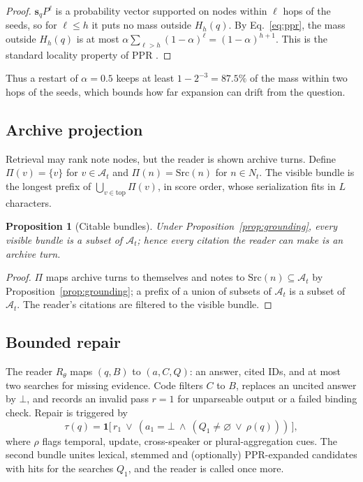 \documentclass[10pt]{article}
\theoremstyle{plain}
\newtheorem{proposition}{Proposition}
\theoremstyle{definition}
\theoremstyle{remark}
\newcommand{\A}{\mathcal{A}}
\begin{document}
\begin{proof}
$\mathbf{s}_qP^{\ell}$ is a probability vector supported on nodes within $\ell$
hops of the seeds, so for $\ell\le h$ it puts no mass outside $H_h(q)$. By
Eq.~\eqref{eq:ppr}, the mass outside $H_h(q)$ is at most
$\alpha\sum_{\ell>h}(1-\alpha)^{\ell}=(1-\alpha)^{h+1}$. This is the standard
locality property of PPR \citep{andersen2006local}.
\end{proof}

Thus a restart of $\alpha=0.5$ keeps at least $1-2^{-3}=87.5\%$ of the mass
within two hops of the seeds, which bounds how far expansion can drift from the
question.

\subsection{Archive projection}

Retrieval may rank note nodes, but the reader is shown archive turns. Define
$\Pi(v)=\{v\}$ for $v\in\A_t$ and $\Pi(n)=\mathrm{Src}(n)$ for $n\in N_t$. The
visible bundle is the longest prefix of $\bigcup_{v\in\mathrm{top}}\Pi(v)$, in
score order, whose serialization fits in $L$ characters.

\begin{proposition}[Citable bundles]
\label{prop:projection}
Under Proposition~\ref{prop:grounding}, every visible bundle is a subset of $\A_t$; hence
every citation the reader can make is an archive turn.
\end{proposition}

\begin{proof}
$\Pi$ maps archive turns to themselves and notes to $\mathrm{Src}(n)\subseteq\A_t$
by Proposition~\ref{prop:grounding}; a prefix of a union of subsets of $\A_t$ is a subset of
$\A_t$. The reader's citations are filtered to the visible bundle.
\end{proof}

\subsection{Bounded repair}

The reader $R_\theta$ maps $(q,B)$ to $(a,C,Q)$: an answer, cited IDs, and at most
two searches for missing evidence. Code filters $C$ to $B$, replaces an uncited
answer by $\bot$, and records an invalid pass $r=1$ for unparseable output or a
failed binding check. Repair is triggered by
\begin{equation}
\tau(q)=\mathbf{1}\bigl[\,r_1\ \lor\ (a_1=\bot\ \land\ (Q_1\neq\varnothing\ \lor\ \rho(q)))\,\bigr],
\label{eq:gate}
\end{equation}
where $\rho$ flags temporal, update, cross-speaker or plural-aggregation cues. The
second bundle unites lexical, stemmed and (optionally) PPR-expanded candidates with
hits for the searches $Q_1$, and the reader is called once more.
\end{document}
